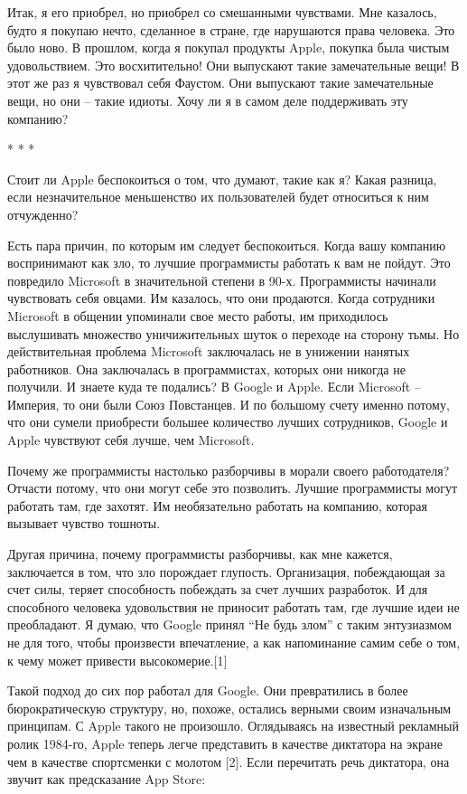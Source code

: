 \documentclass[ebook,12pt,oneside,openany]{memoir}
\begin{document}
Итак, я его приобрел, но приобрел со смешанными чувствами. Мне
казалось, будто я покупаю нечто, сделанное в стране, где нарушаются
права человека. Это было ново. В прошлом, когда я покупал продукты
Apple, покупка была чистым удовольствием. Это восхитительно! Они
выпускают такие замечательные вещи! В этот же раз я чувствовал себя
Фаустом. Они выпускают такие замечательные вещи, но они – такие
идиоты. Хочу ли я в самом деле поддерживать эту компанию?

* * *

Стоит ли Apple беспокоиться о том, что думают, такие как я? Какая
разница, если незначительное меньшенство их пользователей будет
относиться к ним отчужденно?

Есть пара причин, по которым им следует беспокоиться. Когда вашу
компанию воспринимают как зло, то лучшие программисты работать к вам
не пойдут. Это повредило Microsoft в значительной степени в 90-х.
Программисты начинали чувствовать себя овцами. Им казалось, что они
продаются. Когда сотрудники Microsoft в общении упоминали свое место
работы, им приходилось выслушивать множество уничижительных шуток о
переходе на сторону тьмы. Но действительная проблема Microsoft
заключалась не в унижении нанятых работников. Она заключалась в
программистах, которых они никогда не получили. И знаете куда те
подались? В Google и Apple. Если Microsoft – Империя, то они были Союз
Повстанцев. И по большому счету именно потому, что они сумели
приобрести большее количество лучших сотрудников, Google и Apple
чувствуют себя лучше, чем Microsoft.

Почему же программисты настолько разборчивы в морали своего
работодателя? Отчасти потому, что они могут себе это позволить. Лучшие
программисты могут работать там, где захотят. Им необязательно
работать на компанию, которая вызывает чувство тошноты.

Другая причина, почему программисты разборчивы, как мне кажется,
заключается в том, что зло порождает глупость. Организация,
побеждающая за счет силы, теряет способность побеждать за счет лучших
разработок. И для способного человека удовольствия не приносит
работать там, где лучшие идеи не преобладают. Я думаю, что Google
принял “Не будь злом” с таким энтузиазмом не для того, чтобы
произвести впечатление, а как напоминание самим себе о том, к чему
может привести высокомерие.[1]

Такой подход до сих пор работал для Google. Они превратились в более
бюрократическую структуру, но, похоже, остались верными своим
изначальным принципам. С Apple такого не произошло. Оглядываясь на
известный рекламный ролик 1984-го, Apple теперь легче представить в
качестве диктатора на экране чем в качестве спортсменки с молотом [2].
Если перечитать речь диктатора, она звучит как предсказание App Store:
\end{document}
